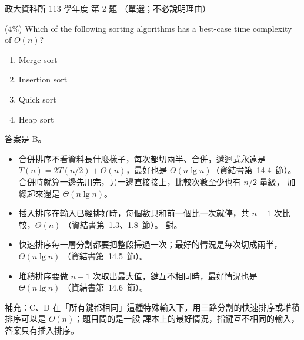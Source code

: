 \begin{pastexam}[label={px:nccu-113-dsa-02}]{政大資科所 113 學年度 第 2 題}
（單選；不必說明理由）

(4\%) Which of the following sorting algorithms has a best-case time complexity of $O(n)$?
\begin{enumerate}[label=\Alph*.]
\item Merge sort
\item Insertion sort
\item Quick sort
\item Heap sort
\end{enumerate}
\end{pastexam}

\begin{pastsoln}
答案是 B。

\begin{itemize}
\item[A.] 合併排序不看資料長什麼樣子，每次都切兩半、合併，遞迴式永遠是 $T(n) = 2T(n/2) + \Theta(n)$，最好也是
$\Theta(n \lg n)$（資結書第~14.4~節）。 合併時就算一邊先用完，另一邊直接接上，比較次數至少也有 $n/2$ 量級，
加總起來還是 $\Theta(n \lg n)$。
\item[B.] 插入排序在輸入已經排好時，每個數只和前一個比一次就停，共 $n - 1$ 次比較，$\Theta(n)$
（資結書第~1.3、1.8~節）。 對。
\item[C.] 快速排序每一層分割都要把整段掃過一次；最好的情況是每次切成兩半，$\Theta(n \lg n)$
（資結書第~14.5~節）。
\item[D.] 堆積排序要做 $n - 1$ 次取出最大值，鍵互不相同時，最好情況也是 $\Theta(n \lg n)$
（資結書第~14.6~節）。
\end{itemize}
補充：C、D 在「所有鍵都相同」這種特殊輸入下，用三路分割的快速排序或堆積排序可以是 $O(n)$；題目問的是一般
課本上的最好情況，指鍵互不相同的輸入，答案只有插入排序。
\end{pastsoln}
